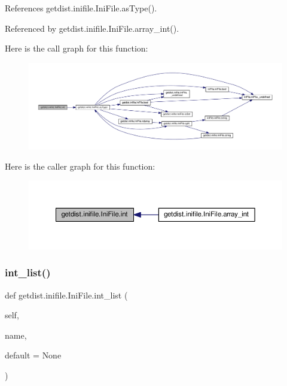 References getdist.\+inifile.\+Ini\+File.\+as\+Type().



Referenced by getdist.\+inifile.\+Ini\+File.\+array\+\_\+int().

Here is the call graph for this function\+:
\nopagebreak
\begin{figure}[H]
\begin{center}
\leavevmode
\includegraphics[width=350pt]{classgetdist_1_1inifile_1_1IniFile_a5b90359abae63c212ee90f077abe8ad9_cgraph}
\end{center}
\end{figure}
Here is the caller graph for this function\+:
\nopagebreak
\begin{figure}[H]
\begin{center}
\leavevmode
\includegraphics[width=350pt]{classgetdist_1_1inifile_1_1IniFile_a5b90359abae63c212ee90f077abe8ad9_icgraph}
\end{center}
\end{figure}
\mbox{\label{classgetdist_1_1inifile_1_1IniFile_a2662f801bfbe7d2a7e20c4f734318a69}} 
\subsubsection{\texorpdfstring{int\+\_\+list()}{int\_list()}}
{\footnotesize\ttfamily def getdist.\+inifile.\+Ini\+File.\+int\+\_\+list (\begin{DoxyParamCaption}\item[{}]{self,  }\item[{}]{name,  }\item[{}]{default = {\ttfamily None} }\end{DoxyParamCaption})}


